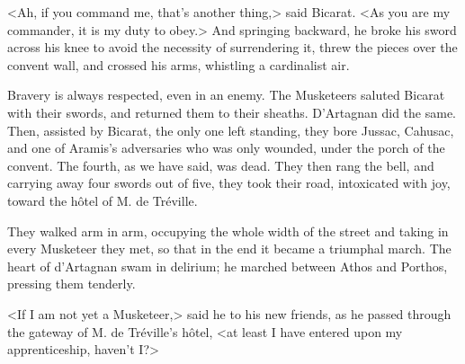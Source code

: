 <Ah, if you command me, that's another thing,> said Bicarat. <As you are my commander, it is my duty to obey.> And springing backward, he broke his sword across his knee to avoid the necessity of surrendering it, threw the pieces over the convent wall, and crossed his arms, whistling a cardinalist air. 

Bravery is always respected, even in an enemy. The Musketeers saluted Bicarat with their swords, and returned them to their sheaths. D'Artagnan did the same. Then, assisted by Bicarat, the only one left standing, they bore Jussac, Cahusac, and one of Aramis's adversaries who was only wounded, under the porch of the convent. The fourth, as we have said, was dead. They then rang the bell, and carrying away four swords out of five, they took their road, intoxicated with joy, toward the hôtel of M. de Tréville. 

They walked arm in arm, occupying the whole width of the street and taking in every Musketeer they met, so that in the end it became a triumphal march. The heart of d'Artagnan swam in delirium; he marched between Athos and Porthos, pressing them tenderly. 

<If I am not yet a Musketeer,> said he to his new friends, as he passed through the gateway of M. de Tréville's hôtel, <at least I have entered upon my apprenticeship, haven't I?> 